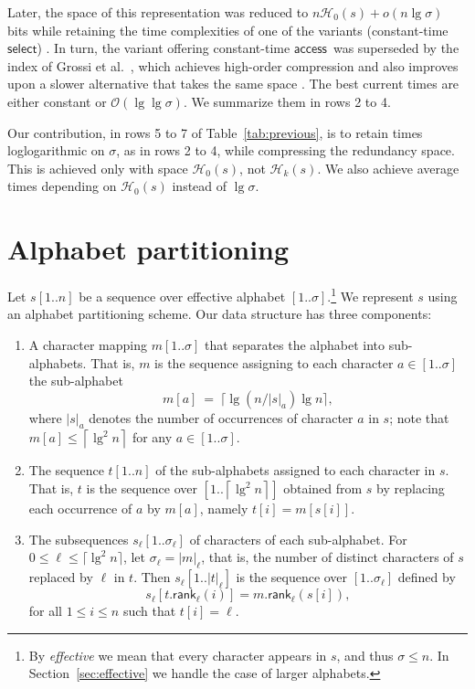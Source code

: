\documentclass[11pt]{article}
\newcommand{\Oh}[1]
    {\ensuremath{\mathcal{O}\left( {#1} \right)}}
\newcommand{\occ}[2]
    {\ensuremath{|{#2}|_{#1}}}
\newcommand{\access}
    {\ensuremath{\mathsf{access}}}
\newcommand{\rank}
    {\ensuremath{\mathsf{rank}}}
\newcommand{\select}
    {\ensuremath{\mathsf{select}}}
\newcommand{\HH}{\mathcal{H}}
\newcommand{\Ho}{\HH_0}
\newcommand{\Hk}{\HH_k}
\newcommand{\mapping}{\ensuremath{{m}}}
\begin{document}
Later, the space of this representation was reduced to
$n\Ho(s)+o(n\lg\sigma)$ bits while retaining the time complexities of
one of the variants (constant-time \select) \cite{BHMR07}. In turn,
the variant offering constant-time \access\ was superseded by the
index of Grossi et al.~\cite{GOR10}, which achieves high-order
compression and also improves upon a slower alternative that takes the
same space \cite{BHMR07}. The best current times are either constant
or $\Oh{\lg\lg\sigma}$.  We summarize them in rows 2 to 4.

\bigskip

Our contribution, in rows 5 to 7 of Table~\ref{tab:previous}, is to
retain times loglogarithmic on $\sigma$, as in rows 2 to 4, while
compressing the redundancy space. This is achieved only with space
$\Ho(s)$, not $\Hk(s)$.  We also achieve average times depending on
$\Ho(s)$ instead of $\lg\sigma$.

\section{Alphabet partitioning} \label{sec:partitioning}

Let \(s [1..n]\) be a sequence over effective alphabet $[1..\sigma]$.\footnote{By {\em effective} we mean that every character appears in
  $s$, and thus \(\sigma \le n\). In Section~\ref{sec:effective} we
  handle the case of larger alphabets.}  We represent $s$ using an
alphabet partitioning scheme. Our data structure has three components:

\begin{enumerate}
\item A character mapping $\mapping[1..\sigma]$ that separates the
  alphabet into sub-alphabets. That is, \(\mapping\) is the sequence
  assigning to each character $a\in[1..\sigma]$ the sub-alphabet
\[\mapping [a] ~=~ \lceil \lg (n / \occ{a}{s}) \lg n \rceil, \]
where $\occ{a}{s}$ denotes the number of occurrences of character $a$
in $s$; note that $\mapping[a] \leq \left\lceil \lg^2 n \right\rceil$
for any $a \in [1..\sigma]$.
\item The sequence $t[1..n]$ of the sub-alphabets assigned to each
  character in $s$. That is, $t$ is the sequence over
  \(\left[1..\left\lceil \lg^2 n \right\rceil \right]\) obtained from
  $s$ by replacing each occurrence of $a$ by \(\mapping [a]\), namely
  $t[i] = \mapping[s[i]]$.
\item The subsequences $s_\ell[1..\sigma_\ell]$ of characters of each
  sub-alphabet. For \(0 \leq \ell \leq \lceil \lg^2 n\rceil\), let
  $\sigma_\ell = \occ{\ell}{\mapping}$, that is, the number of
  distinct characters of $s$ replaced by $\ell$ in $t$. Then \(s_\ell
  [1..\occ{\ell}{t}]\) is the sequence over $[1..\sigma_\ell]$ defined
  by
\[ s_\ell [t.\rank_\ell(i)] = \mapping.\rank_\ell (s [i]),\]
for all $1 \le i \le n$ such that $t[i] = \ell$.
\end{enumerate}
\end{document}
